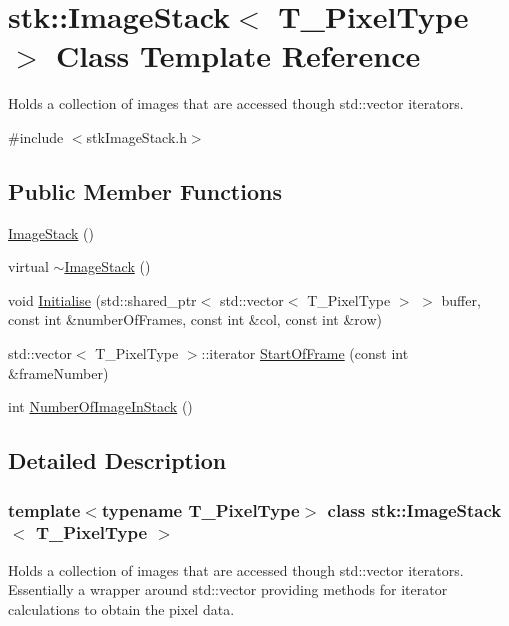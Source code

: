 \hypertarget{classstk_1_1ImageStack}{
\section{stk::ImageStack$<$ T\_\-PixelType $>$ Class Template Reference}
\label{classstk_1_1ImageStack}
}


Holds a collection of images that are accessed though std::vector iterators.  


{\ttfamily \#include $<$stkImageStack.h$>$}\subsection*{Public Member Functions}
\begin{DoxyCompactItemize}
\item 
\hyperlink{classstk_1_1ImageStack_a423e47e3f85dced370a6a688dd357f22}{ImageStack} ()
\item 
virtual \hyperlink{classstk_1_1ImageStack_a9dbdbbd1b1ca0322c07bcfcf906933e5}{$\sim$ImageStack} ()
\item 
void \hyperlink{classstk_1_1ImageStack_a67adffe6f651996e3c025fa0d89fc14c}{Initialise} (std::shared\_\-ptr$<$ std::vector$<$ T\_\-PixelType $>$ $>$ buffer, const int \&numberOfFrames, const int \&col, const int \&row)
\item 
std::vector$<$ T\_\-PixelType $>$::iterator \hyperlink{classstk_1_1ImageStack_af971ec074b7d371d9e44672f5cc6626c}{StartOfFrame} (const int \&frameNumber)
\item 
int \hyperlink{classstk_1_1ImageStack_af3e54a635f493de7f33e492ccb74372c}{NumberOfImageInStack} ()
\end{DoxyCompactItemize}


\subsection{Detailed Description}
\subsubsection*{template$<$typename T\_\-PixelType$>$ class stk::ImageStack$<$ T\_\-PixelType $>$}

Holds a collection of images that are accessed though std::vector iterators. Essentially a wrapper around std::vector providing methods for iterator calculations to obtain the pixel data. 

